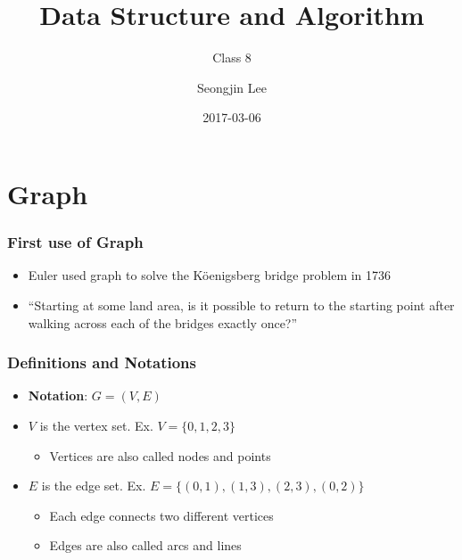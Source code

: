 \documentclass[newPxFont,sthlmFooter,nooffset]{beamer}
\title{Data Structure and Algorithm}
\subtitle{Class 8}
\author[SJL]{Seongjin Lee}
\institute{\href{mailto:insight@gnu.ac.kr}{insight@gnu.ac.kr}\\\url{http://resourceful.github.io}\\Systems Research Lab.\\GNU}
\date{2017-03-06}
\begin{document}
\frame[plain,t]{\titlepage} 



\section{Graph}
\begin{frame}[t]
  \frametitle{First use of Graph}
  \begin{itemize}
  \item Euler used graph to solve the K\"oenigsberg bridge problem in 1736
  \item ``Starting at some land area, is it possible to return to the starting point after walking across each of the bridges exactly once?''
  \end{itemize}
\begin{center}
\end{center}
\end{frame}


\begin{frame}[t]
  \frametitle{Definitions and Notations}
  \begin{itemize}
  \item \textbf{Notation}: $G=(V,E)$
  \item $V$ is the vertex set. Ex. $V= \{0, 1, 2 ,3\}$
    \begin{itemize}
    \item Vertices are also called nodes and points
    \end{itemize}

  \item $E$ is the edge set. Ex. $E= \{(0,1), (1,3), (2,3), (0, 2)\}$
    \begin{itemize}
    \item Each edge connects two different vertices
    \item Edges are also called arcs and lines
    \end{itemize}

  \end{itemize}


\end{frame}
\end{document}
